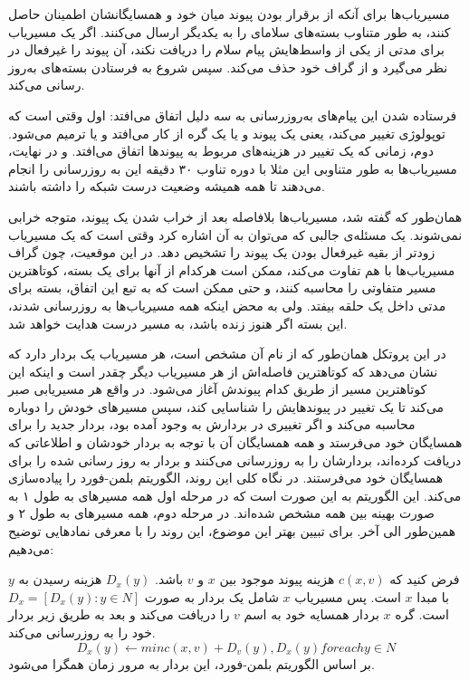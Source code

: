  مسیریاب‌ها برای آنکه از برقرار بودن پیوند میان خود و همسایگانشان اطمینان حاصل کنند، به طور متناوب بسته‌های سلامای را به یکدیگر ارسال می‌کنند. اگر یک مسیریاب برای مدتی از یکی از واسط‌هایش پیام سلام را دریافت نکند، آن پیوند را غیرفعال در نظر می‌گیرد و از گراف خود حذف می‌کند. سپس شروع به فرستادن بسته‌های به‌روز رسانی می‌کند. 
 
فرستاده شدن این پیام‌های به‌روزرسانی به سه دلیل اتفاق می‌افتد: اول وقتی است که توپولوژی تغییر می‌کند، یعنی یک پیوند و یا یک گره از کار می‌افتد و یا ترمیم می‌شود. دوم، زمانی که یک تغییر در هزینه‌های مربوط به پیوند‌ها اتفاق می‌افتد. و در نهایت، مسیریاب‌ها به طور متناوبی این مثلا با دوره تناوب ۳۰ دقیقه این به روزرسانی را انجام می‌دهند تا همه همیشه وضعیت درست شبکه را داشته باشند.  

همان‌طور که گفته شد، مسیریاب‌ها بلافاصله بعد از خراب شدن یک پیوند، متوجه خرابی نمی‌شوند.  یک مسئله‌ی جالبی که می‌توان به آن اشاره کرد وقتی است که یک مسیریاب زودتر از بقیه غیرفعال بودن یک پیوند را تشخیص دهد. در این موقعیت، چون گراف مسیریاب‌ها با هم تفاوت می‌‌کند، ممکن است هرکدام از آنها برای یک بسته، کوتاهترین مسیر متفاوتی را محاسبه کنند، و حتی ممکن است که به تبع این اتفاق، بسته برای مدتی داخل یک حلقه بیفتد. ولی به محض اینکه همه مسیریاب‌ها به روزرسانی شدند، این بسته اگر هنوز زنده باشد، به مسیر درست هدایت خواهد شد. 
 
در این پروتکل همان‌طور که از نام آن مشخص است، هر مسیریاب یک بردار دارد که نشان می‌دهد که کوتاهترین فاصله‌‌اش از هر مسیریاب دیگر چقدر است و اینکه این کوتاهترین مسیر از طریق کدام پیوندش آغاز می‌شود. در واقع هر مسیریابی صبر می‌کند تا یک تغییر در پیوند‌هایش را شناسایی کند، سپس مسیرهای خودش را دوباره محاسبه می‌‌کند و اگر تغییری در بردارش به وجود آمده بود، بردار جدید را برای همسایگان خود می‌فرستد و همه همسایگان آن با توجه به بردار خودشان و اطلاعاتی که دریافت کرده‌اند، بردارشان را به روزرسانی می‌‌کنند و بردار به روز رسانی شده را برای همسایگان خود می‌فرستند. در نگاه کلی این روند، الگوریتم بلمن-فورد را پیاده‌سازی می‌‌کند. این الگوریتم به این صورت است که در مرحله اول همه مسیرهای به طول ۱ به صورت بهینه بین همه مشخص شده‌اند. در مرحله دوم، همه مسیرهای به طول ۲ و همین‌طور الی آخر. 
برای تبیین بهتر این موضوع، این روند را با معرفی نمادهایی توضیح می‌دهیم:‌

فرض کنید که $c(x,v)$ هزینه پیوند موجود بین $x$ و $v$ باشد. $D_{x}(y)$ هزینه رسیدن به $y$ با مبدا $x$ است. پس مسیریاب $x$ شامل یک بردار به صورت $D_{x}=[D_{x}(y):y\in N]$ است. گره $x$ بردار همسایه خود به اسم $v$  را دریافت می‌‌کند و بعد به طریق زیر بردار خود را به 
روزرسانی می‌کند. $$D_{x}(y) \leftarrow min{c(x,v) + D_{v}(y), D_{x}(y)} for each y \in N$$
بر اساس الگوریتم بلمن-فورد، این بردار به مرور زمان همگرا می‌شود. 
   
